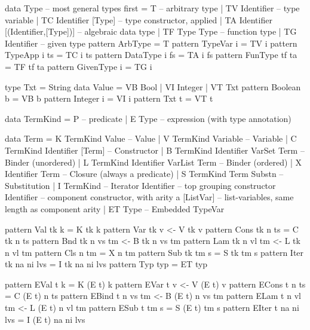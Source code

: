 \begin{code}
data Type -- most general types first
 = T  -- arbitrary type
 | TV Identifier -- type variable
 | TC Identifier [Type] -- type constructor, applied
 | TA Identifier [(Identifier,[Type])] -- algebraic data type
 | TF Type Type -- function type
 | TG Identifier -- given type
pattern ArbType = T
pattern TypeVar i  = TV i
pattern TypeApp i ts = TC i ts
pattern DataType i fs = TA i fs
pattern FunType tf ta = TF tf ta
pattern GivenType i = TG i
\end{code}


\begin{code}
type Txt = String
data Value
 = VB Bool
 | VI Integer
 | VT Txt
pattern Boolean b  =  VB b
pattern Integer i  =  VI i
pattern Txt     t  =  VT t
\end{code}

\begin{code}
data TermKind
 = P -- predicate
 | E Type -- expression (with type annotation)
\end{code}

\begin{code}
data Term
 = K TermKind Value                    -- Value
 | V TermKind Variable                 -- Variable
 | C TermKind Identifier [Term]        -- Constructor
 | B TermKind Identifier VarSet Term   -- Binder (unordered)
 | L TermKind Identifier VarList Term  -- Binder (ordered)
 | X Identifier Term                   -- Closure (always a predicate)
 | S TermKind Term Substn              -- Substitution
 | I TermKind                          -- Iterator
     Identifier  -- top grouping constructor
     Identifier  -- component constructor, with arity a
     [ListVar]   -- list-variables, same length as component arity
 | ET Type                              -- Embedded TypeVar
\end{code}

\begin{code}
pattern Val  tk k          =   K tk k
pattern Var  tk v          <-  V tk v
pattern Cons tk n ts       =   C tk n ts
pattern Bnd  tk n vs tm    <-  B tk n vs tm
pattern Lam  tk n vl tm    <-  L tk n vl tm
pattern Cls     n    tm    =   X n tm
pattern Sub  tk tm s       =   S tk tm s
pattern Iter tk na ni lvs  =   I tk na ni lvs
pattern Typ  typ           =   ET typ
\end{code}

\begin{code}
pattern EVal t k           =  K (E t) k
pattern EVar t v          <-  V (E t) v
pattern ECons t n ts       =  C (E t) n ts
pattern EBind t n vs tm   <-  B (E t) n vs tm
pattern ELam t n vl tm    <-  L (E t) n vl tm
pattern ESub t tm s        =  S (E t) tm s
pattern EIter t na ni lvs  =  I (E t) na ni lvs
\end{code}

